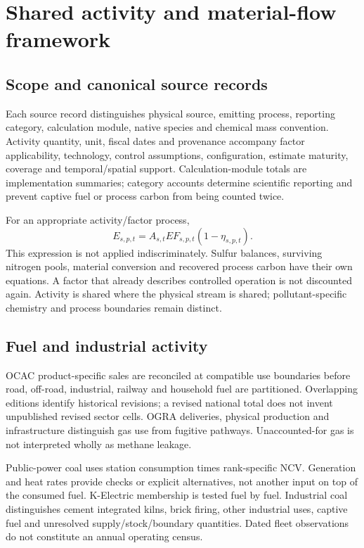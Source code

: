 \section{Shared activity and material-flow framework}\label{sec:architecture}
\subsection{Scope and canonical source records}
Each source record distinguishes physical source, emitting process, reporting category, calculation module, native species and chemical mass convention. Activity quantity, unit, fiscal dates and provenance accompany factor applicability, technology, control assumptions, configuration, estimate maturity, coverage and temporal/spatial support. Calculation-module totals are implementation summaries; category accounts determine scientific reporting and prevent captive fuel or process carbon from being counted twice.

For an appropriate activity/factor process,
\begin{equation}E_{s,p,t}=A_{s,t}EF_{s,p,t}(1-\eta_{s,p,t}).\end{equation}
This expression is not applied indiscriminately. Sulfur balances, surviving nitrogen pools, material conversion and recovered process carbon have their own equations. A factor that already describes controlled operation is not discounted again. Activity is shared where the physical stream is shared; pollutant-specific chemistry and process boundaries remain distinct.

\subsection{Fuel and industrial activity}
OCAC product-specific sales are reconciled at compatible use boundaries before road, off-road, industrial, railway and household fuel are partitioned. Overlapping editions identify historical revisions; a revised national total does not invent unpublished revised sector cells. OGRA deliveries, physical production and infrastructure distinguish gas use from fugitive pathways. Unaccounted-for gas is not interpreted wholly as methane leakage.

Public-power coal uses station consumption times rank-specific NCV. Generation and heat rates provide checks or explicit alternatives, not another input on top of the consumed fuel. K-Electric membership is tested fuel by fuel. Industrial coal distinguishes cement integrated kilns, brick firing, other industrial uses, captive fuel and unresolved supply/stock/boundary quantities. Dated fleet observations do not constitute an annual operating census.

